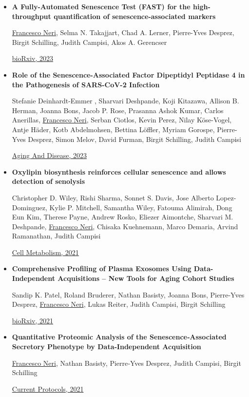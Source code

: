 \documentclass[
  letterpaper,
  DIV=11,
  numbers=noendperiod]{scrartcl}
\begin{document}
\begin{itemize}
\item
  \textbf{A Fully-Automated Senescence Test (FAST) for the
  high-throughput quantification of senescence-associated markers}

  \ul{Francesco Neri}, Selma N. Takajjart, Chad A. Lerner, Pierre-Yves
  Desprez, Birgit Schilling, Judith Campisi, Akos A. Gerencser

  \href{http://dx.doi.org/10.1101/2023.12.22.573123}{bioRxiv, 2023}
\item
  \textbf{Role of the Senescence-Associated Factor Dipeptidyl Peptidase
  4 in the Pathogenesis of SARS-CoV-2 Infection}

  Stefanie Deinhardt-Emmer , Sharvari Deshpande, Koji Kitazawa, Allison
  B. Herman, Joanna Bons, Jacob P. Rose, Prasanna Ashok Kumar, Carlos
  Anerillas, \ul{Francesco Neri}, Serban Ciotlos, Kevin Perez, Nilay
  Köse-Vogel, Antje Häder, Kotb Abdelmohsen, Bettina Löffler, Myriam
  Gorospe, Pierre-Yves Desprez, Simon Melov, David Furman, Birgit
  Schilling, Judith Campisi

  \href{http://dx.doi.org/10.14336/ad.2023.0812}{Aging And Disease,
  2023}
\item
  \textbf{Oxylipin biosynthesis reinforces cellular senescence and
  allows detection of senolysis}

  Christopher D. Wiley, Rishi Sharma, Sonnet S. Davis, Jose Alberto
  Lopez-Dominguez, Kylie P. Mitchell, Samantha Wiley, Fatouma Alimirah,
  Dong Eun Kim, Therese Payne, Andrew Rosko, Eliezer Aimontche, Sharvari
  M. Deshpande, \ul{Francesco Neri}, Chisaka Kuehnemann, Marco Demaria,
  Arvind Ramanathan, Judith Campisi

  \href{http://dx.doi.org/10.1016/j.cmet.2021.03.008}{Cell Metabolism,
  2021}
\item
  \textbf{Comprehensive Profiling of Plasma Exosomes Using
  Data-Independent Acquisitions -- New Tools for Aging Cohort Studies}

  Sandip K. Patel, Roland Bruderer, Nathan Basisty, Joanna Bons,
  Pierre-Yves Desprez, \ul{Francesco Neri}, Lukas Reiter, Judith
  Campisi, Birgit Schilling

  \href{http://dx.doi.org/10.1101/2021.02.27.433188}{bioRxiv, 2021}
\item
  \textbf{Quantitative Proteomic Analysis of the Senescence‐Associated
  Secretory Phenotype by Data‐Independent Acquisition}

  \ul{Francesco Neri}, Nathan Basisty, Pierre‐Yves Desprez, Judith
  Campisi, Birgit Schilling

  \href{http://dx.doi.org/10.1002/cpz1.32}{Current Protocols, 2021}
\end{itemize}
\end{document}
